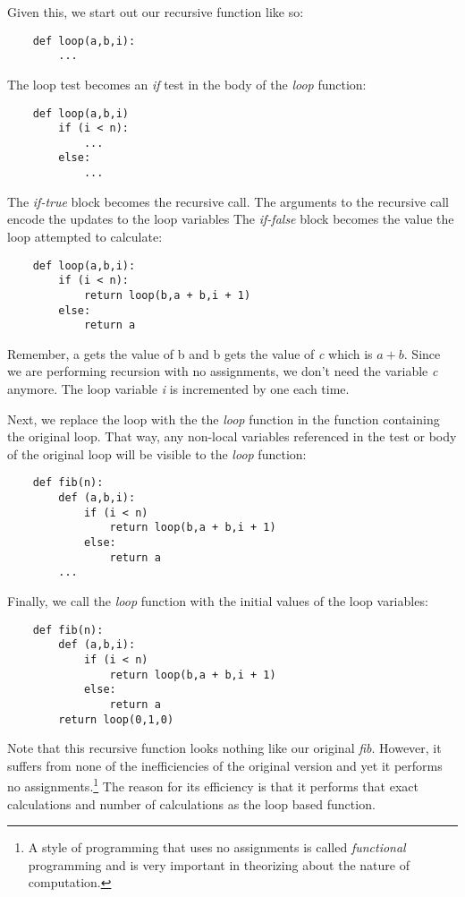 Given this, we start out
our recursive function like so:

\begin{verbatim}
    def loop(a,b,i):
        ...
\end{verbatim}

The loop test becomes an {\it if} test in the body of
the {\it loop} function:

\begin{verbatim}
    def loop(a,b,i)
        if (i < n):
            ...
        else:
            ...
\end{verbatim}

The {\it if-true} block becomes the recursive call.
The arguments to the recursive call encode the updates
to the loop variables 
The {\it if-false} block becomes the value the loop attempted to
calculate:

\begin{verbatim}
    def loop(a,b,i):
        if (i < n):
            return loop(b,a + b,i + 1)
        else:
            return a
\end{verbatim}

Remember, a gets the value of b and b gets the value of
{\it c} which is $a + b$. Since we are performing recursion
with no assignments, we don't need the variable {\it c} anymore.
The loop variable {\it i} is incremented
by one each time.

Next, we replace the loop with the the {\it loop} function in the
function
containing the original loop. That way, any non-local variables
referenced in the test or body of the original loop will
be visible to the {\it loop} function:

\begin{verbatim}
    def fib(n):
        def (a,b,i):
            if (i < n)
                return loop(b,a + b,i + 1)
            else:
                return a
        ...
\end{verbatim}

Finally, we call the {\it loop} function with the initial
values of the loop variables:

\begin{verbatim}
    def fib(n):
        def (a,b,i):
            if (i < n)
                return loop(b,a + b,i + 1)
            else:
                return a
        return loop(0,1,0)
\end{verbatim}

Note that this recursive function looks nothing like our
original {\it fib}. However, it suffers from none of the inefficiencies
of the original version and yet it performs no assignments.\footnote{
A style of programming that uses no assignments is called {\it functional}
programming and is very important in theorizing about the nature
of computation.} The reason for its efficiency is that it performs
that exact calculations and number of calculations as the
loop based function.

